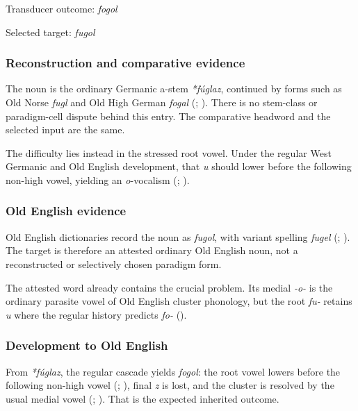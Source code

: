 \documentclass[
  british,
  a4paper,
]{article}
\begin{document}
Transducer outcome: \emph{fogol}

Selected target: \emph{fugol}

\subsubsection{Reconstruction and comparative
evidence}\label{reconstruction-and-comparative-evidence-3}

The noun is the ordinary Germanic a-stem \emph{*fúglaz}, continued by
forms such as Old Norse \emph{fugl} and Old High German \emph{fogal}
(;
). There is no stem-class or
paradigm-cell dispute behind this entry. The comparative headword and
the selected input are the same.

The difficulty lies instead in the stressed root vowel. Under the
regular West Germanic and Old English development, that \emph{u} should
lower before the following non-high vowel, yielding an \emph{o}-vocalism
(;
).

\subsubsection{Old English evidence}\label{old-english-evidence-3}

Old English dictionaries record the noun as \emph{fugol}, with variant
spelling \emph{fugel} (; ).
The target is therefore an attested ordinary Old English noun, not a
reconstructed or selectively chosen paradigm form.

The attested word already contains the crucial problem. Its medial
\emph{-o-} is the ordinary parasite vowel of Old English cluster
phonology, but the root \emph{fu-} retains \emph{u} where the regular
history predicts \emph{fo-} ().

\subsubsection{Development to Old
English}\label{development-to-old-english-3}

From \emph{*fúglaz}, the regular cascade yields \emph{fogol}: the root
vowel lowers before the following non-high vowel
(;
), final \emph{z} is lost,
and the cluster is resolved by the usual medial vowel
(;
). That is the expected
inherited outcome.
\end{document}
